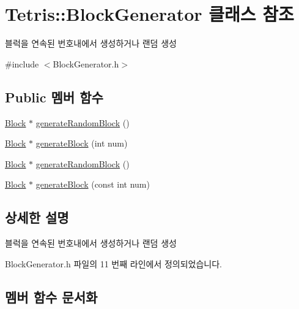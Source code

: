\hypertarget{class_tetris_1_1_block_generator}{}\section{Tetris\+:\+:Block\+Generator 클래스 참조}
\label{class_tetris_1_1_block_generator}


블럭을 연속된 번호내에서 생성하거나 랜덤 생성  




{\ttfamily \#include $<$Block\+Generator.\+h$>$}

\subsection*{Public 멤버 함수}
\begin{DoxyCompactItemize}
\item 
\hyperlink{class_tetris_1_1_block}{Block} $\ast$ \hyperlink{class_tetris_1_1_block_generator_a10dfe1467d40437ad41c5ae76437ad78}{generate\+Random\+Block} ()
\item 
\hyperlink{class_tetris_1_1_block}{Block} $\ast$ \hyperlink{class_tetris_1_1_block_generator_a581b22cebe170d3fe8b51130c01e7a22}{generate\+Block} (int num)
\item 
\hyperlink{class_tetris_1_1_block}{Block} $\ast$ \hyperlink{class_tetris_1_1_block_generator_a434df5baf3944a534492b63763b532a6}{generate\+Random\+Block} ()
\item 
\hyperlink{class_tetris_1_1_block}{Block} $\ast$ \hyperlink{class_tetris_1_1_block_generator_a584fde2bfe1cdd4505bd905befd73d21}{generate\+Block} (const int num)
\end{DoxyCompactItemize}


\subsection{상세한 설명}
블럭을 연속된 번호내에서 생성하거나 랜덤 생성 

Block\+Generator.\+h 파일의 11 번째 라인에서 정의되었습니다.



\subsection{멤버 함수 문서화}
\mbox{\label{class_tetris_1_1_block_generator_a581b22cebe170d3fe8b51130c01e7a22}} 
